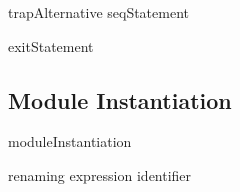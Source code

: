 \bgrm
trapAlternative \Derive
  \trm{::}  \trm{=>} seqStatement
\egrm

\bgrm
exitStatement \Derive
    
\egrm

\subsection{Module Instantiation}
\bgrm 
moduleInstantiation \Derive
    
\egrm

\bgrm
renaming \Derive
  expression \trm{/} identifier
\egrm















